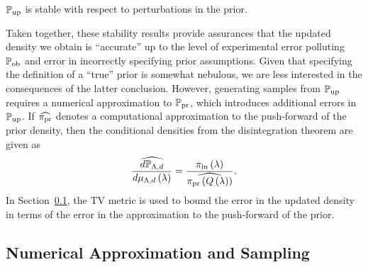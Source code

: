 \begin{thm}
$\operatorname*{\mathbb{P}_{up}}$ is stable with respect to perturbations in the prior.
\label{thm:stableprior}
\end{thm}

Taken together, these stability results provide assurances that the updated density we obtain is ``accurate'' up to the level of experimental error polluting $\operatorname*{\mathbb{P}_{ob}}$ and error in incorrectly specifying prior assumptions. 
Given that specifying the definition of a ``true'' prior is somewhat nebulous, we are less interested in the consequences of the latter conclusion.
However, generating samples from $\operatorname*{\mathbb{P}_{up}}$ requires a numerical approximation to $\operatorname*{\mathbb{P}_{pr}}$, which introduces additional errors in $\operatorname*{\mathbb{P}_{up}}$.
If $\widehat{\operatorname*{\pi_{pr}}}$ denotes a computational approximation to the push-forward of the prior density, then the conditional densities from the disintegration theorem are given as
\[
\frac{\widehat{d\mathbb{P}_{{\Lambda}, d}}}{d\mu_{{\Lambda}, d}\left ( \lambda \right )} = \frac{\operatorname*{\pi_{in}}\left ( \lambda \right )}{ \widehat{\operatorname*{\pi_{pr}}\left ( Q\left ( \lambda \right ) \right )} }.
\]
In Section~\ref{sec:approx}, the TV metric is used to bound the error in the updated density in terms of the error in the approximation to the push-forward of the prior.



\subsection{Numerical Approximation and Sampling}\label{sec:approx}
%
%
%
%


